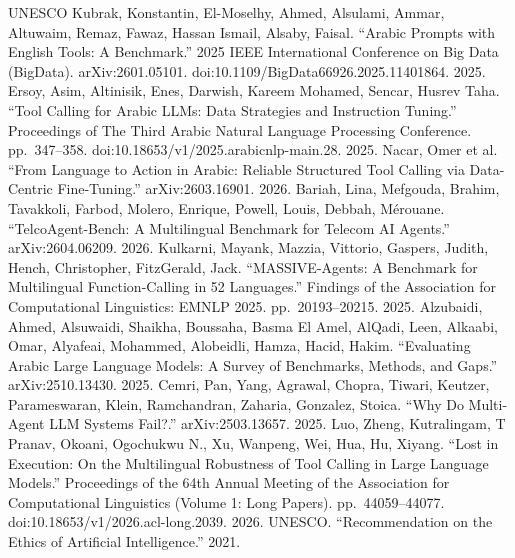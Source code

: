 \documentclass[11pt]{article}
\begin{document}
\begin{thebibliography}{UNESCO}
\setlength{\itemsep}{2pt}
 Kubrak, Konstantin, El-Moselhy, Ahmed, Alsulami, Ammar, Altuwaim, Remaz, Fawaz, Hassan Ismail, Alsaby, Faisal. ``Arabic Prompts with English Tools: A Benchmark.'' 2025 IEEE International Conference on Big Data (BigData). arXiv:2601.05101. doi:10.1109/BigData66926.2025.11401864. 2025.
 Ersoy, Asim, Altinisik, Enes, Darwish, Kareem Mohamed, Sencar, Husrev Taha. ``Tool Calling for Arabic LLMs: Data Strategies and Instruction Tuning.'' Proceedings of The Third Arabic Natural Language Processing Conference. pp.\ 347--358. doi:10.18653/v1/2025.arabicnlp-main.28. 2025.
 Nacar, Omer et al. ``From Language to Action in Arabic: Reliable Structured Tool Calling via Data-Centric Fine-Tuning.'' arXiv:2603.16901. 2026.
 Bariah, Lina, Mefgouda, Brahim, Tavakkoli, Farbod, Molero, Enrique, Powell, Louis, Debbah, M{\'e}rouane. ``TelcoAgent-Bench: A Multilingual Benchmark for Telecom AI Agents.'' arXiv:2604.06209. 2026.
 Kulkarni, Mayank, Mazzia, Vittorio, Gaspers, Judith, Hench, Christopher, FitzGerald, Jack. ``MASSIVE-Agents: A Benchmark for Multilingual Function-Calling in 52 Languages.'' Findings of the Association for Computational Linguistics: EMNLP 2025. pp.\ 20193--20215. 2025.
 Alzubaidi, Ahmed, Alsuwaidi, Shaikha, Boussaha, Basma El Amel, AlQadi, Leen, Alkaabi, Omar, Alyafeai, Mohammed, Alobeidli, Hamza, Hacid, Hakim. ``Evaluating Arabic Large Language Models: A Survey of Benchmarks, Methods, and Gaps.'' arXiv:2510.13430. 2025.
 Cemri, Pan, Yang, Agrawal, Chopra, Tiwari, Keutzer, Parameswaran, Klein, Ramchandran, Zaharia, Gonzalez, Stoica. ``Why Do Multi-Agent LLM Systems Fail?.'' arXiv:2503.13657. 2025.
 Luo, Zheng, Kutralingam, T Pranav, Okoani, Ogochukwu N., Xu, Wanpeng, Wei, Hua, Hu, Xiyang. ``Lost in Execution: On the Multilingual Robustness of Tool Calling in Large Language Models.'' Proceedings of the 64th Annual Meeting of the Association for Computational Linguistics (Volume 1: Long Papers). pp.\ 44059--44077. doi:10.18653/v1/2026.acl-long.2039. 2026.
 {UNESCO}. ``Recommendation on the Ethics of Artificial Intelligence.'' 2021.
\end{thebibliography}
\end{document}
